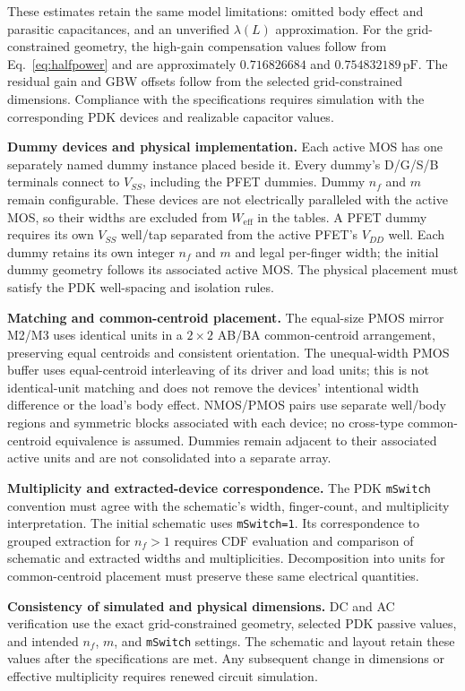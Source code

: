 \documentclass[12pt,letterpaper]{article}
\newcommand{\pF}{\,\mathrm{pF}}
\begin{document}
\begin{enumerate}
These estimates retain the same model limitations: omitted body effect
and parasitic capacitances, and an unverified $\lambda(L)$ approximation.
For the grid-constrained geometry, the high-gain compensation values
follow from Eq.~\eqref{eq:halfpower} and
are approximately $0.716826684$ and $0.754832189\pF$.
The residual gain and GBW offsets follow from the selected grid-constrained
dimensions. Compliance with the specifications requires simulation
with the corresponding PDK devices and realizable capacitor values.

\newpage
\textbf{Dummy devices and physical implementation.}
Each active MOS has one separately named dummy instance placed
beside it.
Every dummy's D/G/S/B terminals connect to $V_{SS}$, including
the PFET dummies. Dummy $n_f$ and $m$ remain configurable.
These devices are not electrically paralleled with the active MOS,
so their widths are excluded from $W_{\mathrm{eff}}$ in the tables.
A PFET dummy requires its own $V_{SS}$ well/tap separated from
the active PFET's $V_{DD}$ well. Each dummy retains its own integer
$n_f$ and $m$ and legal per-finger width; the initial dummy geometry
follows its associated active MOS. The physical placement must satisfy
the PDK well-spacing and isolation rules.

\textbf{Matching and common-centroid placement.}
The equal-size PMOS mirror M2/M3 uses identical units in a
$2\times2$ AB/BA common-centroid arrangement, preserving equal
centroids and consistent orientation. The unequal-width PMOS buffer
uses equal-centroid interleaving of its driver and load units;
this is not identical-unit matching and does not remove the devices'
intentional width difference or the load's body effect.
NMOS/PMOS pairs use separate well/body regions and symmetric blocks
associated with each device; no cross-type common-centroid equivalence
is assumed. Dummies remain adjacent to their associated active units
and are not consolidated into a separate array.

\textbf{Multiplicity and extracted-device correspondence.}
The PDK \texttt{mSwitch} convention must agree with the schematic's
width, finger-count, and multiplicity interpretation.
The initial schematic uses \texttt{mSwitch=1}. Its correspondence
to grouped extraction for $n_f>1$ requires CDF evaluation and
comparison of schematic and extracted widths and multiplicities.
Decomposition into units for common-centroid placement must preserve
these same electrical quantities.

\textbf{Consistency of simulated and physical dimensions.}
DC and AC verification use the exact grid-constrained geometry,
selected PDK passive values, and intended $n_f$, $m$, and
\texttt{mSwitch} settings. The schematic and layout retain these
values after the specifications are met. Any subsequent change in
dimensions or effective multiplicity requires renewed circuit simulation.
\end{enumerate}
\end{document}
